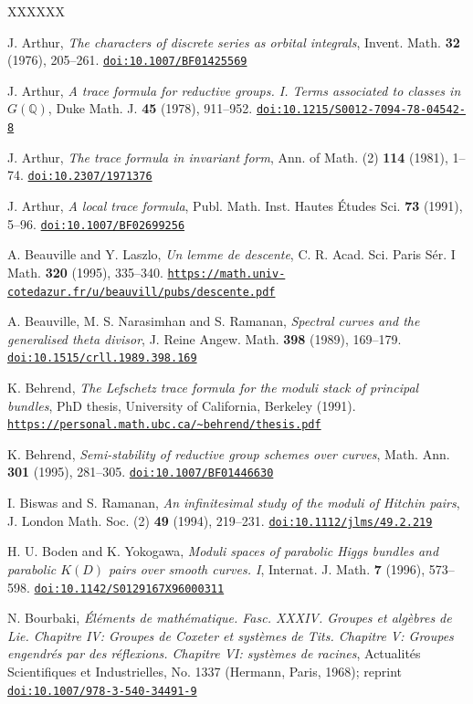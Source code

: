 \documentclass[12pt,a4paper,oneside,english,leqno]{smfart}
\numberwithin{theo}{subsection}
\newcommand{\doi}[1]{\href{https://doi.org/#1}{\texttt{doi:#1}}}
\newcommand{\urlref}[1]{\href{#1}{\nolinkurl{#1}}}
\begin{document}
\begin{thebibliography}{XXXXXX}

 J. Arthur, \emph{The characters of discrete series as orbital integrals}, Invent. Math. \textbf{32} (1976), 205--261. \doi{10.1007/BF01425569}

 J. Arthur, \emph{A trace formula for reductive groups. I. Terms associated to classes in $G(\mathbb{Q})$}, Duke Math. J. \textbf{45} (1978), 911--952. \doi{10.1215/S0012-7094-78-04542-8}

 J. Arthur, \emph{The trace formula in invariant form}, Ann. of Math. (2) \textbf{114} (1981), 1--74. \doi{10.2307/1971376}

 J. Arthur, \emph{A local trace formula}, Publ. Math. Inst. Hautes \'Etudes Sci. \textbf{73} (1991), 5--96. \doi{10.1007/BF02699256}

 A. Beauville and Y. Laszlo, \emph{Un lemme de descente}, C. R. Acad. Sci. Paris S\'er. I Math. \textbf{320} (1995), 335--340. \urlref{https://math.univ-cotedazur.fr/u/beauvill/pubs/descente.pdf}

 A. Beauville, M. S. Narasimhan and S. Ramanan, \emph{Spectral curves and the generalised theta divisor}, J. Reine Angew. Math. \textbf{398} (1989), 169--179. \doi{10.1515/crll.1989.398.169}

 K. Behrend, \emph{The Lefschetz trace formula for the moduli stack of principal bundles}, PhD thesis, University of California, Berkeley (1991). \urlref{https://personal.math.ubc.ca/~behrend/thesis.pdf}

 K. Behrend, \emph{Semi-stability of reductive group schemes over curves}, Math. Ann. \textbf{301} (1995), 281--305. \doi{10.1007/BF01446630}

 I. Biswas and S. Ramanan, \emph{An infinitesimal study of the moduli of Hitchin pairs}, J. London Math. Soc. (2) \textbf{49} (1994), 219--231. \doi{10.1112/jlms/49.2.219}

 H. U. Boden and K. Yokogawa, \emph{Moduli spaces of parabolic Higgs bundles and parabolic $K(D)$ pairs over smooth curves. I}, Internat. J. Math. \textbf{7} (1996), 573--598. \doi{10.1142/S0129167X96000311}

 N. Bourbaki, \emph{\'El\'ements de math\'ematique. Fasc. XXXIV. Groupes et alg\`ebres de Lie. Chapitre IV: Groupes de Coxeter et syst\`emes de Tits. Chapitre V: Groupes engendr\'es par des r\'eflexions. Chapitre VI: syst\`emes de racines}, Actualit\'es Scientifiques et Industrielles, No. 1337 (Hermann, Paris, 1968); reprint \doi{10.1007/978-3-540-34491-9}


\end{thebibliography}
\end{document}
